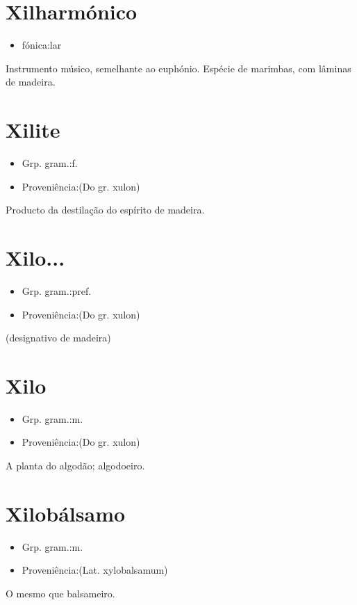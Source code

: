 \section{Xilharmónico}
\begin{itemize}
\item {fónica:lar}
\end{itemize}
Instrumento músico, semelhante ao euphónio.
Espécie de marimbas, com lâminas de madeira.
\section{Xilite}
\begin{itemize}
\item {Grp. gram.:f.}
\end{itemize}
\begin{itemize}
\item {Proveniência:(Do gr. \textunderscore xulon\textunderscore )}
\end{itemize}
Producto da destilação do espírito de madeira.
\section{Xilo...}
\begin{itemize}
\item {Grp. gram.:pref.}
\end{itemize}
\begin{itemize}
\item {Proveniência:(Do gr. \textunderscore xulon\textunderscore )}
\end{itemize}
(designativo de \textunderscore madeira\textunderscore )
\section{Xilo}
\begin{itemize}
\item {Grp. gram.:m.}
\end{itemize}
\begin{itemize}
\item {Proveniência:(Do gr. \textunderscore xulon\textunderscore )}
\end{itemize}
A planta do algodão; algodoeiro.
\section{Xilobálsamo}
\begin{itemize}
\item {Grp. gram.:m.}
\end{itemize}
\begin{itemize}
\item {Proveniência:(Lat. \textunderscore xylobalsamum\textunderscore )}
\end{itemize}
O mesmo que \textunderscore balsameiro\textunderscore .
